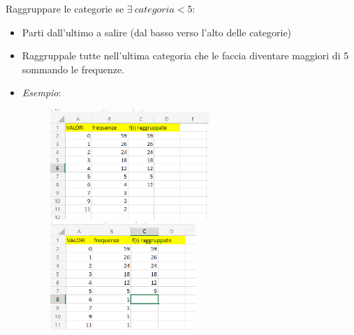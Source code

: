 Raggruppare le categorie se $\exists \ categoria < 5$:
\begin{itemize}
      \item Parti dall'ultimo a salire (dal basso verso l'alto delle
            categorie)
      \item Raggruppale tutte nell'ultima categoria che le faccia
            diventare maggiori di 5 sommando le frequenze.
      \item \textit{Esempio}:
            \begin{figure}[H]
                  \centering
                  \includegraphics[width=6cm, keepaspectratio]{capitoli/goodnes_of_fit/imgs/vesceragay.png}
                  \includegraphics[width=5.5cm, keepaspectratio]{capitoli/goodnes_of_fit/imgs/POSTAMOLTOGAY.png}
            \end{figure}
\end{itemize}